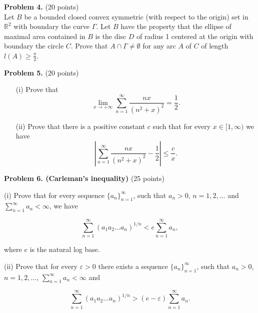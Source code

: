 \documentclass{article}
\begin{document}
\textbf{Problem 4.} (20 points) \\
Let \( B \) be a bounded closed convex symmetric (with respect to the origin)
set in \( \mathbb{R}^2 \) with boundary the curve \( \Gamma \). Let \( B \)
have the property that the ellipse of maximal area contained in \( B \)
is the disc \( D \) of radius 1 centered at the origin with boundary
the circle \( C \). Prove that \( A \cap \Gamma \neq \emptyset \)
for any arc \( A \) of \( C \) of length \( l(A) \geq \frac{\pi}{2} \).

\textbf{Problem 5.} (20 points)
\begin{itemize}
    \item[(i)] Prove that
    \[
    \lim_{x \to +\infty} \sum_{n=1}^{\infty} \frac{nx}{(n^2 + x)^2} = \frac{1}{2}.
    \]
    \item[(ii)] Prove that there is a positive constant \( c \) such that for every \( x \in [1, \infty) \) we have
    \[
    \left| \sum_{n=1}^{\infty} \frac{nx}{(n^2 + x)^2} - \frac{1}{2} \right| \leq \frac{c}{x}.
    \]
\end{itemize}

\textbf{Problem 6. (Carleman’s inequality)} (25 points)

(i) Prove that for every sequence \(\{a_n\}_{n=1}^\infty\), such that \(a_n > 0\), \(n = 1,2,\ldots\) and \(\sum_{n=1}^{\infty} a_n < \infty\), we have

\[
\sum_{n=1}^{\infty} (a_1 a_2 \ldots a_n)^{1/n} < e \sum_{n=1}^{\infty} a_n,
\]

where \( e \) is the natural log base.

(ii) Prove that for every \( \varepsilon > 0 \) there exists a sequence \(\{a_n\}_{n=1}^\infty\), such that \(a_n > 0\), \(n = 1,2,\ldots\), \(\sum_{n=1}^{\infty} a_n < \infty\) and

\[
\sum_{n=1}^{\infty} (a_1 a_2 \ldots a_n)^{1/n} > (e - \varepsilon) \sum_{n=1}^{\infty} a_n.
\]
\end{document}
